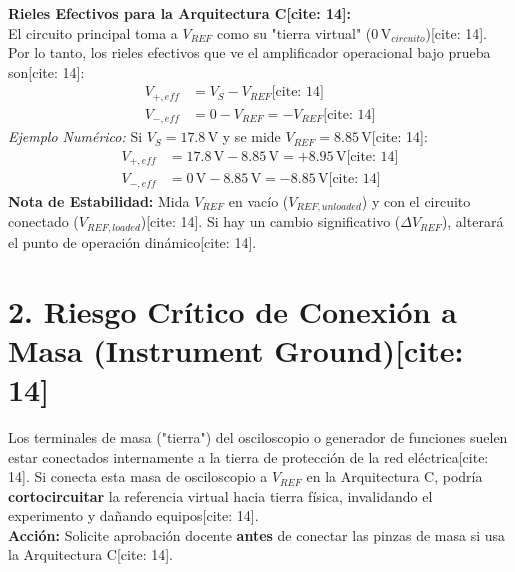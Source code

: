 \documentclass[11pt, a4paper]{article}
\begin{document}
\textbf{Rieles Efectivos para la Arquitectura C[cite: 14]:} \\
El circuito principal toma a $V_{REF}$ como su "tierra virtual" ($0\,\text{V}_{circuito}$)[cite: 14]. Por lo tanto, los rieles efectivos que ve el amplificador operacional bajo prueba son[cite: 14]:
\begin{align*}
    V_{+,eff} &= V_S - V_{REF} \text{[cite: 14]} \\
    V_{-,eff} &= 0 - V_{REF} = -V_{REF} \text{[cite: 14]}
\end{align*}
\textit{Ejemplo Numérico:} Si $V_S = 17.8\,\text{V}$ y se mide $V_{REF} = 8.85\,\text{V}$[cite: 14]:
\begin{align*}
    V_{+,eff} &= 17.8\,\text{V} - 8.85\,\text{V} = \boxed{+8.95\,\text{V}} \text{[cite: 14]} \\
    V_{-,eff} &= 0\,\text{V} - 8.85\,\text{V} = \boxed{-8.85\,\text{V}} \text{[cite: 14]}
\end{align*}
\textbf{Nota de Estabilidad:} Mida $V_{REF}$ en vacío ($V_{REF,unloaded}$) y con el circuito conectado ($V_{REF,loaded}$)[cite: 14]. Si hay un cambio significativo ($\Delta V_{REF}$), alterará el punto de operación dinámico[cite: 14].

\section*{2. Riesgo Crítico de Conexión a Masa (Instrument Ground)[cite: 14]}
\begin{tcolorbox}[colback=red!5, colframe=red!70!black, title=\textbf{Verificación Obligatoria de Equipos}]
    \raggedright
    Los terminales de masa ("tierra") del osciloscopio o generador de funciones suelen estar conectados internamente a la tierra de protección de la red eléctrica[cite: 14]. 
    Si conecta esta masa de osciloscopio a $V_{REF}$ en la Arquitectura C, podría \textbf{cortocircuitar} la referencia virtual hacia tierra física, invalidando el experimento y dañando equipos[cite: 14]. \\
    \textbf{Acción:} Solicite aprobación docente \textbf{antes} de conectar las pinzas de masa si usa la Arquitectura C[cite: 14].
\end{tcolorbox}
\end{document}
